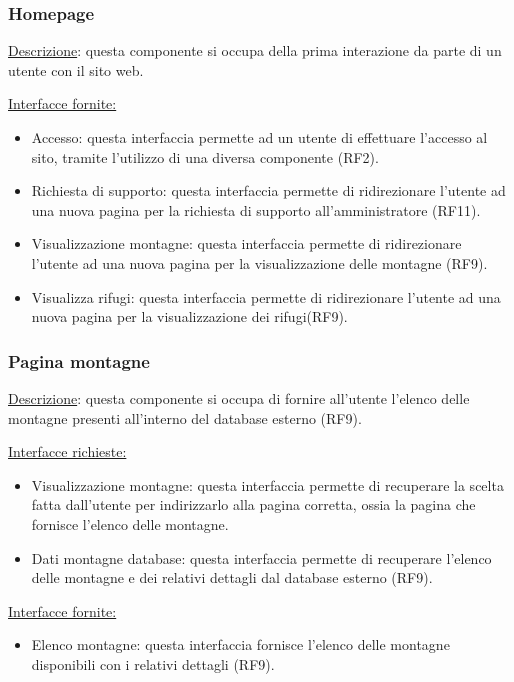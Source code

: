 \documentclass[a4paper,12pt]{article}
\begin{document}
\subsubsection{Homepage}
\underline{Descrizione}: questa componente si occupa della prima interazione da parte di un utente con il sito web.
  
\underline{Interfacce fornite:} 
\begin{itemize}
    \item Accesso: questa interfaccia permette ad un utente di effettuare l'accesso al sito, tramite l'utilizzo di una diversa componente (RF2).
    \item Richiesta di supporto: questa interfaccia permette di ridirezionare l'utente ad una nuova pagina per la richiesta di supporto all'amministratore (RF11).
    \item Visualizzazione montagne: questa interfaccia permette di ridirezionare l'utente ad una nuova pagina per la visualizzazione delle montagne (RF9).
    \item Visualizza rifugi: questa interfaccia permette di ridirezionare l'utente ad una nuova pagina per la visualizzazione dei rifugi(RF9).
\end{itemize}



\subsubsection{Pagina montagne}
\underline{Descrizione}: questa componente si occupa di fornire all'utente l'elenco delle montagne presenti all'interno del database esterno (RF9).

\underline{Interfacce richieste:}
\begin{itemize}
\item Visualizzazione montagne: questa interfaccia permette di recuperare la scelta fatta dall'utente per indirizzarlo alla pagina corretta, ossia la pagina che fornisce l'elenco delle montagne.
\item Dati montagne database: questa interfaccia permette di recuperare l'elenco delle montagne e dei relativi dettagli dal database esterno (RF9).
\end{itemize}

\underline{Interfacce fornite:}
\begin{itemize}
\item Elenco montagne: questa interfaccia fornisce l'elenco delle montagne disponibili con i relativi dettagli (RF9). 
\end{itemize}
\end{document}
